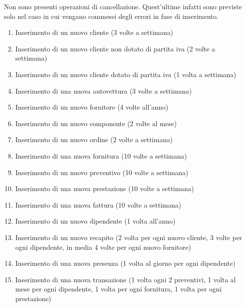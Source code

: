 		Non sono presenti operazioni di cancellazione. Quest'ultime infatti sono previste solo nel caso in cui vengano commessi degli errori in fase di inserimento.
	
		\begin{enumerate}
			
			\item \label{op:new_cliente} Inserimento di un nuovo cliente (3 volte a settimana)
			\item \label{op:new_privato} Inserimento di un nuovo cliente non dotato di partita iva (2 volte a settimana)
			\item \label{op:new_azienda} Inserimento di un nuovo cliente dotato di partita iva (1 volta a settimana)
			\item \label{op:new_auto} Inserimento di una nuova autovettura (3 volte a settimana)
			\item \label{op:new_fornitore} Inserimento di un nuovo fornitore (4 volte all’anno)
			\item \label{op:new_componente} Inserimento di un nuovo componente (2 volte al mese)
			\item \label{op:new_ordine} Inserimento di un nuovo ordine (2 volte a settimana)
			\item \label{op:new_fornitura} Inserimento di una nuova fornitura (10 volte a settimana)
			\item \label{op:new_preventivo} Inserimento di un nuovo preventivo (10 volte a settimana)
			\item \label{op:new_prestazione} Inserimento di una nuova prestazione (10 volte a settimana)
			\item \label{op:new_fattura} Inserimento di una nuova fattura (10 volte a settimana)
			\item \label{op:new_operatore} Inserimento di un nuovo dipendente (1 volta all’anno)
			\item \label{op:new_recapito}Inserimento di un nuovo recapito (2 volta per ogni nuovo cliente, 3 volte per ogni dipendente, in media 4 volte per ogni nuovo fornitore)
			\item \label{op:new_presenza}Inserimento di una nuova presenza (1 volta al giorno per ogni dipendente)
			\item \label{op:new_transazione}Inserimento di una nuova transazione (1 volta ogni 2 preventivi, 1 volta al mese per ogni dipendente, 1 volta per ogni fornitura, 1 volta per ogni prestazione)
			

\end{enumerate}
